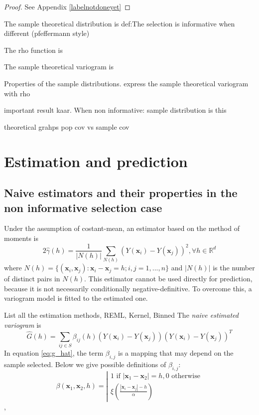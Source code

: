 \documentclass[12pt]{article}
\theoremstyle{definition}
\theoremstyle{remark}
\newcommand{\paramnuisance}{\xi}
\newcommand{\Sample}{S}
\newcommand{\position}{\mathbf{x}}
\newcommand{\Signal}{Y}
\begin{document}
\begin{proof}
See Appendix \ref{labelnotdoneyet}
\end{proof}



\label{sec:pop_samp_distr}
The sample theoretical distribution is
def:The selection is informative when different (pfeffermann style)

The rho function is

The sample theoretical variogram is

Properties of the sample distributions.
express the sample theoretical variogram with rho


important result kaar. When non informative: sample distribution is this


 
 theoretical grahps pop cov vs sample cov 
\section{Estimation and prediction} \label{sec:estimation}

\subsection{Naive estimators and their properties in the non informative selection case}

Under the assumption of costant-mean, an estimator based on the method of moments is 
\begin{equation} \label{eq:variogram_hat}
2\hat{\gamma}\left(h\right)=\frac{1}{|N\left(h\right)|}\sum_{N\left(h\right)}{\left(\Signal\left(\position_{i}\right)-\Signal\left(\position_{j}\right)\right)^{2}},\forall h\in\mathbb{R}^{d}
\end{equation}
where $N\left(h\right)=\lbrace\left(\position_{i},\position_{j}\right):\position_{i}-\position_{j}=h;i,j=1,...,n\rbrace$ and $|N\left(h\right)|$ is the number of distinct pairs in $N\left(h\right)$. This estimator cannot be used directly for prediction, because it is not necessarily conditionally negative-definitive. To overcome this, a variogram model is fitted to the estimated one. 

List all the estimation methods, REML, Kernel, Binned
The \emph{naive estimated variogram} is 
\begin{equation} \label{eq:g_hat}
    \hat{G}(h)=\sum_{ij\in\Sample}{\beta_{ij}(h)(\Signal(\position_{i})-\Signal(\position_{j}))(\Signal(\position_{i})-Y(\position_{j}))^{T}}
\end{equation}
In equation \eqref{eq:g_hat}, the term $\beta_{i,j}$ is a mapping that may depend on the sample selected.
Below we give possible definitions of $\beta_{i,j}$:
\begin{equation}
    \beta(\position_1,\position_2,h)=
    \left|\begin{array}{l}
    1 \text{ if } |\position_1-\position_2|=h, 0 \text{ otherwise}\\
    \paramnuisance(\frac{|\position_{i}-\position_{j}|-h}{\alpha})
    \end{array}\right.
\end{equation},
\end{document}
